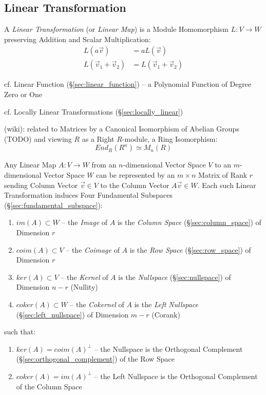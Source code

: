 \subsection{Linear Transformation}\label{sec:linear_transformation}

A \emph{Linear Transformation} (or \emph{Linear Map}) is a Module Homomorphism
$L : V \rightarrow W$ preserving Addition and Scalar Multiplication:
\begin{align*}
  L(a\vec{v})              & = aL(\vec{v}) \\
  L(\vec{v}_1 + \vec{v}_2) & = L(\vec{v}_1 + \vec{v}_2)
\end{align*}

\fist cf. Linear Function (\S\ref{sec:linear_function}) -- a Polynomial
Function of Degree Zero or One

\fist cf. Locally Linear Transformations (\S\ref{sec:locally_linear})

(wiki): related to Matrices by a Canonical Isomorphism of Abelian Groups (TODO)
and viewing $R$ as a Right $R$-module, a Ring Isomorphism:
\[
  End_R(R^n) \simeq M_n(R)
\]

Any Linear Map $A : V \rightarrow W$ from an $n$-dimensional Vector Space $V$
to an $m$-dimensional Vector Space $W$ can be represented by an $m \times n$
Matrix of Rank $r$ sending Column Vector $\vec{v} \in V$ to the Column Vector
$A\vec{v} \in W$. Each such Linear Transformation induces Four Fundamental
Subspaces (\S\ref{sec:fundamental_subspace}):
\begin{enumerate}
  \item $im(A) \subset W$ -- the \emph{Image} of $A$ is the \emph{Column Space}
    (\S\ref{sec:column_space}) of Dimension $r$
  \item $coim(A) \subset V$ -- the \emph{Coimage} of $A$ is the \emph{Row Space}
    (\S\ref{sec:row_space}) of Dimension $r$
  \item $ker(A) \subset V$ -- the \emph{Kernel} of $A$ is the \emph{Nullspace}
    (\S\ref{sec:nullspace}) of Dimension $n - r$ (Nullity) %
  \item $coker(A) \subset W$ -- the \emph{Cokernel} of $A$ is the \emph{Left
    Nullspace} (\S\ref{sec:left_nullspace}) of Dimension $m - r$ (Corank)
\end{enumerate}
such that:
\begin{enumerate}
  \item $ker(A) = coim(A)^\bot$ -- the Nullspace is the Orthogonal Complement
    (\S\ref{sec:orthogonal_complement}) of the Row Space
  \item $coker(A) = im(A)^\bot$ -- the Left Nullspace is the Orthogonal
    Complement of the Column Space
\end{enumerate}

